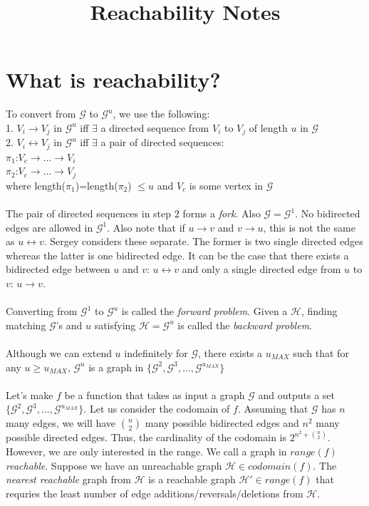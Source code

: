 \documentclass{article}
\theoremstyle{definition}
\begin{document}
\title{Reachability Notes}
\maketitle

\section{What is reachability?}

To convert from $\mathcal{G}$ to $\mathcal{G}^u$, we use the following:
\\
1. $V_i \rightarrow V_j$ in $\mathcal{G}^u$ iff $\exists$ a directed sequence from $V_i$ to $V_j$ of length $u$ in $\mathcal{G}$
\\
2. $V_i \leftrightarrow V_j$ in $\mathcal{G}^u$ iff $\exists$ a pair of directed sequences:
\\
$ \pi_1$:$ V_c \rightarrow ... \rightarrow V_i$
\\
$ \pi_2$:$ V_c \rightarrow ... \rightarrow V_j$
\\
where length($\pi_1$)=length($\pi_2$) $\leq u$ and $V_c$ is some vertex in $\mathcal{G}$ 
\\
\\
The pair of directed sequences in step $2$ forms a \textit{fork}. Also $\mathcal{G}= \mathcal{G}^1$. No bidirected edges are allowed in $\mathcal{G}^1$. Also note that if $u \rightarrow v$ and $v \rightarrow u$, this is not the same as $u \leftrightarrow v$. Sergey considers these separate. The former is two single directed edges whereas the latter is one bidirected edge. It can be the case that there exists a bidirected edge between $u$ and $v$: $u \leftrightarrow v$ and only a single directed edge from $u$ to $v$: $u \rightarrow v$.
\\
\\
Converting from $\mathcal{G}^1$ to $\mathcal{G}^u$ is called the \textit{forward problem}. Given a $\mathcal{H}$, finding matching $\mathcal{G}$'s and $u$ satisfying $\mathcal{H} = \mathcal{G}^u$ is called the \textit{backward problem}. 
\\
\\
Although we can extend $u$ indefinitely for $\mathcal{G}$, there exists a $u_{MAX}$ such that for any $u \geq u_{MAX}$, $\mathcal{G}^{u}$ is a graph in $\{\mathcal{G}^2,\mathcal{G}^3,...,\mathcal{G}^{u_{MAX}}\}$
\\
\\
Let's make $f$ be a function that takes as input a graph $\mathcal{G}$ and outputs a set $\{\mathcal{G}^2,\mathcal{G}^3,...,\mathcal{G}^{u_{MAX}}\}$. Let us consider the codomain of $f$. Assuming that $\mathcal{G}$ has $n$ many edges, we will have ${n \choose 2}$ many possible bidirected edges and $n^2$ many possible directed edges. Thus, the cardinality of the codomain is $2^{n^2+{n \choose 2}}$. However, we are only interested in the range. We call a graph in $range(f)$ \textit{reachable}. Suppose we have an unreachable graph $\mathcal{H} \in codomain(f)$. The \textit{nearest reachable} graph from $\mathcal{H}$ is a reachable graph $\mathcal{H'} \in range(f)$ that requries the least number of edge additions/reversals/deletions from $\mathcal{H}$.
\end{document}
